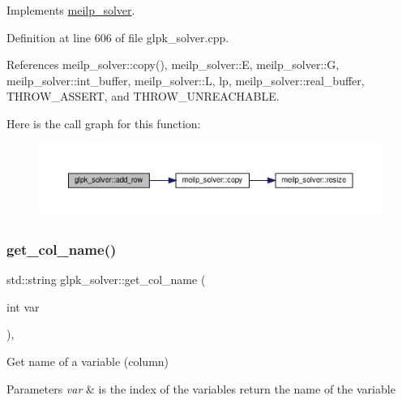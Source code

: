 Implements \hyperlink{classmeilp__solver_a844cb83be66ee0afe42edc2a60fd17cf}{meilp\+\_\+solver}.



Definition at line 606 of file glpk\+\_\+solver.\+cpp.



References meilp\+\_\+solver\+::copy(), meilp\+\_\+solver\+::E, meilp\+\_\+solver\+::G, meilp\+\_\+solver\+::int\+\_\+buffer, meilp\+\_\+solver\+::L, lp, meilp\+\_\+solver\+::real\+\_\+buffer, T\+H\+R\+O\+W\+\_\+\+A\+S\+S\+E\+RT, and T\+H\+R\+O\+W\+\_\+\+U\+N\+R\+E\+A\+C\+H\+A\+B\+LE.

Here is the call graph for this function\+:
\nopagebreak
\begin{figure}[H]
\begin{center}
\leavevmode
\includegraphics[width=350pt]{db/d0a/classglpk__solver_aca58bff8b056f40912822a8063db14d6_cgraph}
\end{center}
\end{figure}
\mbox{\label{classglpk__solver_a00812df3ae9f05cbddd617425d8398da}} 
\subsubsection{\texorpdfstring{get\+\_\+col\+\_\+name()}{get\_col\_name()}}
{\footnotesize\ttfamily std\+::string glpk\+\_\+solver\+::get\+\_\+col\+\_\+name (\begin{DoxyParamCaption}\item[{int}]{var }\end{DoxyParamCaption})\hspace{0.3cm}{\ttfamily [override]}, {\ttfamily [virtual]}}



Get name of a variable (column) 


\begin{DoxyParams}{Parameters}
{\em var} & is the index of the variables return the name of the variable \\
\hline
\end{DoxyParams}


